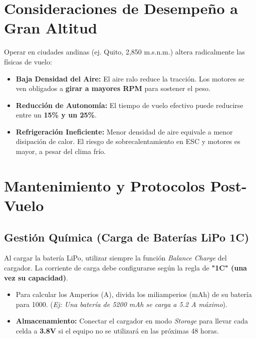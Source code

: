 \documentclass[12pt,a4paper]{article}
\begin{document}
\section{Consideraciones de Desempeño a Gran Altitud}
Operar en ciudades andinas (ej. Quito, 2,850 m.s.n.m.) altera radicalmente las físicas de vuelo:
\begin{itemize}[leftmargin=*]
    \item \textbf{Baja Densidad del Aire:} El aire ralo reduce la tracción. Los motores se ven obligados a \textbf{girar a mayores RPM} para sostener el peso.
    \item \textbf{Reducción de Autonomía:} El tiempo de vuelo efectivo puede reducirse entre un \textbf{15\% y un 25\%}.
    \item \textbf{Refrigeración Ineficiente:} Menor densidad de aire equivale a menor disipación de calor. El riesgo de sobrecalentamiento en ESC y motores es mayor, a pesar del clima frío.
\end{itemize}

\section{Mantenimiento y Protocolos Post-Vuelo}

\subsection{Gestión Química (Carga de Baterías LiPo 1C)}
Al cargar la batería LiPo, utilizar siempre la función \textit{Balance Charge} del cargador. La corriente de carga debe configurarse según la regla de \textbf{"1C" (una vez su capacidad)}. 
\begin{itemize}[leftmargin=*]
    \item Para calcular los Amperios (A), divida los miliamperios (mAh) de su batería para 1000. (\textit{Ej: Una batería de 5200 mAh se carga a 5.2 A máximo}).
    \item \textbf{Almacenamiento:} Conectar el cargador en modo \textit{Storage} para llevar cada celda a \textbf{3.8V} si el equipo no se utilizará en las próximas 48 horas.
\end{itemize}
\end{document}
